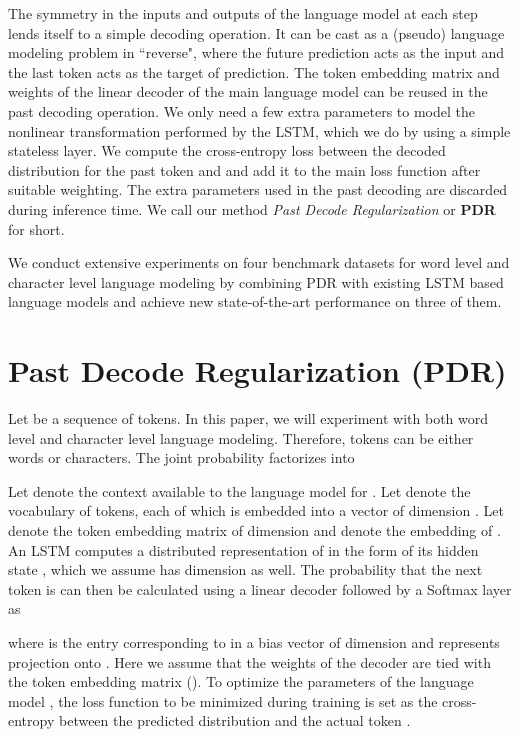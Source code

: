 \documentclass{article} \usepackage{iclr2019_conference,times}
\begin{document}
The symmetry in the inputs and outputs of the language model at each step lends itself to a simple decoding operation. It can be cast as a (pseudo) language modeling problem in ``reverse", where  the future prediction  acts as the input and the last token  acts as the target of prediction. The token embedding matrix and weights of the linear decoder of the main language model can be reused in the past decoding operation. We only need a few extra parameters to model the nonlinear transformation performed by the LSTM, which we do by using a simple stateless layer. We compute the cross-entropy loss between the decoded distribution for the past token and  and add it to the main loss function after suitable weighting. The extra parameters used in the past decoding are discarded during inference time. We call our method \emph{Past Decode Regularization} or \textbf{PDR} for short. 

We conduct extensive experiments on four benchmark datasets for word level and character level language modeling by combining PDR with existing LSTM based language models and achieve new state-of-the-art performance on three of them.  
\section{Past Decode Regularization (PDR)}
Let  be a sequence of tokens. In this paper, we will experiment with both word level and character level language modeling. Therefore, tokens can be either words or characters. The joint probability  factorizes into 

Let  denote the context available to the language model for . Let  denote the vocabulary of tokens, each of which is embedded into a vector of dimension . Let  denote the token embedding matrix of dimension  and  denote the embedding of . 
An LSTM computes a distributed representation of   in the form of its hidden state , which we assume has dimension  as well. 
The probability that the next token is  can then be calculated using a linear decoder followed by a Softmax layer as 
 
where  is the entry corresponding to  in a bias vector   of dimension  and   represents projection onto . Here we assume that the weights of the decoder are tied with the token embedding matrix  (\cite{Inan2016TyingWV,Press2017UsingTO}). To optimize the parameters of the language model , the loss function to be minimized during training  is set as the cross-entropy between the predicted distribution  and the actual token .
 
\end{document}
